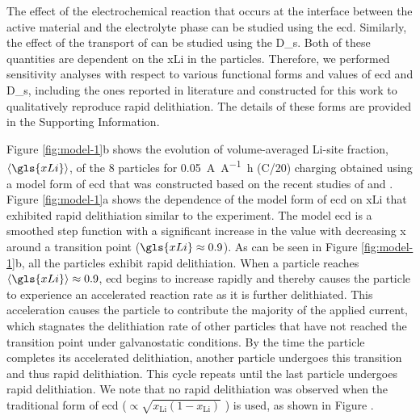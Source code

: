 \documentclass{article}
\begin{document}
The effect of the electrochemical reaction that occurs at the
interface between the active material and the electrolyte phase can be
studied using the \gls{ecd}. Similarly, the effect of
the transport of  can be studied using the
\gls{D_s}. Both of these quantities are dependent on the
\gls{xLi} in the particles. Therefore, we performed sensitivity
analyses with respect to various functional forms and values of
\gls{ecd} and \gls{D_s}, including the ones reported in literature and
constructed for this work to qualitatively reproduce rapid
delithiation. The details of these forms are provided in the
Supporting Information.

Figure \ref{fig:model-1}b shows the evolution of volume-averaged
Li-site fraction, $\left\langle \gls{xLi} \right\rangle$, of the 8
particles for \SI{0.05}{\ampere\per\ampere\hour} (C/20) charging
obtained using a model form of \gls{ecd} that was constructed based on
the recent studies of \nca{} \cite{chueh2021} and \nmc{}
\cite{tsai2018, mukherjee2017, chiang2020}. Figure \ref{fig:model-1}a
shows the dependence of the model form of \gls{ecd} on \gls{xLi} that
exhibited rapid delithiation similar to the experiment. The model
\gls{ecd} is a smoothed step function with a significant increase in
the value with decreasing x around a transition point
($\gls{xLi}\approx0.9$). As can be seen in Figure \ref{fig:model-1}b,
all the particles exhibit rapid delithiation. When a particle reaches
$\left\langle \gls{xLi} \right\rangle\approx0.9$, \gls{ecd} begins to
increase rapidly and thereby causes the particle to experience an
accelerated reaction rate as it is further delithiated. This
acceleration causes the particle to contribute the majority of the
applied current, which stagnates the delithiation rate of other
particles that have not reached the transition point under
galvanostatic conditions. By the time the particle completes its
accelerated delithiation, another particle undergoes this transition
and thus rapid delithiation. This cycle repeats until the last
particle undergoes rapid delithiation.  We note that no rapid
delithiation was observed when the traditional form of \gls{ecd}
($\propto\sqrt{{x_{\textrm{Li}}}(1-{x_{\textrm{Li}}})}$
\cite{newman1993, newman1994, newman1995, newman1996}) is used, as
shown in Figure .
\end{document}
